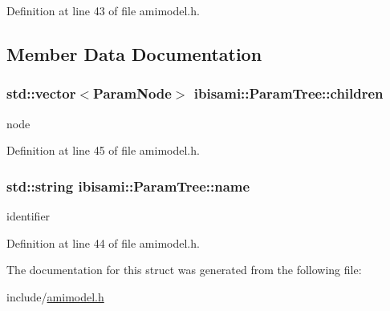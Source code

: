 Definition at line 43 of file amimodel.\+h.



\subsection{Member Data Documentation}
\hypertarget{structibisami_1_1_param_tree_a512771aaec7a303ebcafd7c66812dd7f}{}
\subsubsection[{children}]{\setlength{\rightskip}{0pt plus 5cm}std\+::vector$<${\bf Param\+Node}$>$ ibisami\+::\+Param\+Tree\+::children}\label{structibisami_1_1_param_tree_a512771aaec7a303ebcafd7c66812dd7f}


node 



Definition at line 45 of file amimodel.\+h.

\hypertarget{structibisami_1_1_param_tree_a6776eb67c955420e87360ed764bc5cf3}{}
\subsubsection[{name}]{\setlength{\rightskip}{0pt plus 5cm}std\+::string ibisami\+::\+Param\+Tree\+::name}\label{structibisami_1_1_param_tree_a6776eb67c955420e87360ed764bc5cf3}


identifier 



Definition at line 44 of file amimodel.\+h.



The documentation for this struct was generated from the following file\+:\begin{DoxyCompactItemize}
\item 
include/\hyperlink{amimodel_8h}{amimodel.\+h}\end{DoxyCompactItemize}

